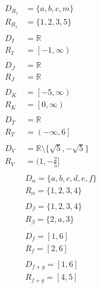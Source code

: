\documentclass[12pt, letterpaper]{article}
\begin{document}
\color{myColor}

    \begin{align*}
        D_{R_1} &= \{a, b, c, m\} \\
        R_{R_1} &= \{1, 2, 3, 5\} \\
        \\
        D_{I} &= \mathbb{R} \\
        R_{I} &= \left[-1, \infty\right) \\
        \\
        D_{J} &= \mathbb{R} \\
        R_{J} &= \mathbb{R} \\
        \\
        D_{K} &= \left[-5,\infty\right) \\
        R_{K} &= \left[0,\infty\right) \\
        \\
        D_T &= \mathbb{R} \\
        R_T &= \left( -\infty, 6 \right] \\
        \\
        D_V &= \mathbb{R} \setminus \{\sqrt{5}, -\sqrt{5}\} \\
        R_V &= (1, -\frac{2}{5}] \\
        \\
        & D_{\alpha} = \{a, b, c, d, e, f\} \\
        & R_{\alpha} = \{1, 2, 3, 4\} \\
        \\
        & D_{\beta} = \{1, 2, 3, 4\} \\
        & R_{\beta} = \{2, a, 3\} \\
        \\
        & D_{f} = \left[1, 6\right] \\
        & R_{f} = \left[2, 6\right] \\
        \\
        & D_{f+g} = \left[1, 6\right] \\
        & R_{f+g} = \left[4, 5\right]
    \end{align*}
\end{document}

